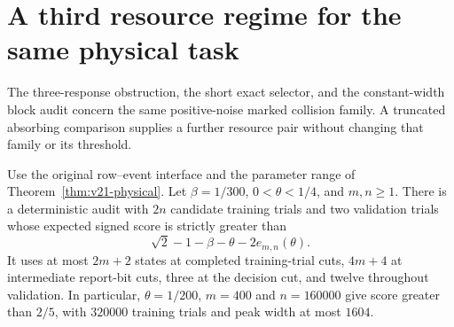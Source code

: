 \section{A third resource regime for the same physical task}
\label{sec:v22-physical}
The three-response obstruction, the short exact selector, and the
constant-width block audit concern the same positive-noise marked
collision family. A truncated absorbing comparison supplies a further
resource pair without changing that family or its threshold.

\begin{theorem}
\label{thm:v22-physical}
Use the original row--event interface and the parameter range of
Theorem~\ref{thm:v21-physical}. Let $\beta=1/300$, $0<\theta<1/4$,
and $m,n\ge1$. There is a deterministic audit with $2n$ candidate
training trials and two validation trials whose expected signed score
is strictly greater than
\begin{equation}\label{eq:v22-physical-score}
 \sqrt2-1-\beta-\theta-2e_{m,n}(\theta).
\end{equation}
It uses at most $2m+2$ states at completed training-trial cuts,
$4m+4$ at intermediate report-bit cuts, three at the decision cut, and
twelve throughout validation. In particular, $\theta=1/200$, $m=400$
and $n=160000$ give score greater than $2/5$, with $320000$ training
trials and peak width at most $1604$.
\end{theorem}

